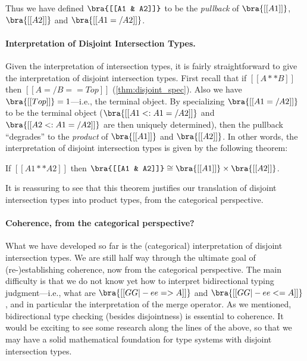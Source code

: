 Thus we have defined $\bra{[[A1 & A2]]}$ to be the \textit{pullback} of
$\bra{[[A1]]}$, $\bra{[[A2]]}$ and $\bra{[[A1 =/ A2]]}$.

\paragraph{Interpretation of Disjoint Intersection Types.}

Given the interpretation of intersection types, it is fairly straightforward to
give the interpretation of disjoint intersection types. First recall that if
$[[A ** B]]$ then $[[ A =/ B == Top ]]$ (\cref{thm:disjoint_spec}). Also we have
$\bra{[[Top]]} = 1$---i.e., the terminal object. By specializing $\bra{[[A1 =/ A2]]}$ to be the terminal object
($\bra{[[A1 <: A1 =/ A2]]}$ and $\bra{[[A2 <: A1 =/ A2]]}$ are then uniquely
determined), then the pullback ``degrades'' to the \textit{product} of
$\bra{[[A1]]}$ and $\bra{[[A2]]}$. In other words, the interpretation of
disjoint intersection types is given by the following theorem:
\begin{theorem}
  If $[[A1 ** A2]]$ then $\bra{[[A1 & A2]]} \cong \bra{[[A1]]} \times \bra{[[A2]]} $.
\end{theorem}
\begin{remark}
It is reassuring to see that this theorem justifies our translation of
disjoint intersection types into product types, from the categorical
perspective.
\end{remark}



\paragraph{Coherence, from the categorical perspective?}

What we have developed so far is the (categorical) interpretation of disjoint intersection
types. We are still half way through the ultimate goal of (re-)establishing
coherence, now from the categorical perspective. The main difficulty is that we
do not know yet how to interpret bidirectional typing judgment---i.e., what are
$\bra{[[GG |- ee => A]]}$ and $\bra{[[GG |- ee <= A]]}$, and in particular the
interpretation of the merge operator. As we mentioned, bidirectional type checking
(besides disjointness) is essential to coherence. It would be exciting to see
some research along the lines of the above, so that we may have a solid
mathematical foundation for type systems with disjoint intersection types.

